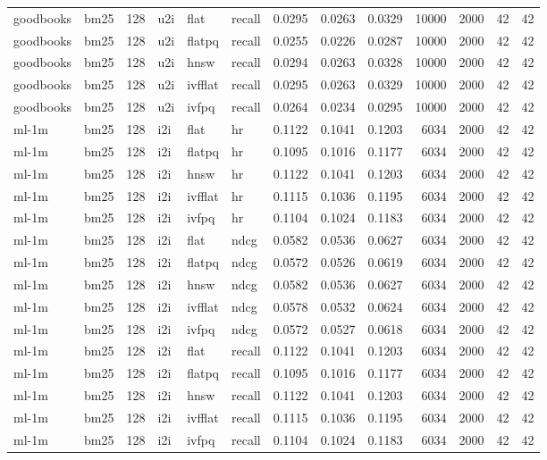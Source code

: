 \begin{tabular}{llrlllrrrrrrr}
goodbooks & bm25 & 128 & u2i & flat & recall & 0.0295 & 0.0263 & 0.0329 & 10000 & 2000 & 42 & 42 \\
goodbooks & bm25 & 128 & u2i & flatpq & recall & 0.0255 & 0.0226 & 0.0287 & 10000 & 2000 & 42 & 42 \\
goodbooks & bm25 & 128 & u2i & hnsw & recall & 0.0294 & 0.0263 & 0.0328 & 10000 & 2000 & 42 & 42 \\
goodbooks & bm25 & 128 & u2i & ivfflat & recall & 0.0295 & 0.0263 & 0.0329 & 10000 & 2000 & 42 & 42 \\
goodbooks & bm25 & 128 & u2i & ivfpq & recall & 0.0264 & 0.0234 & 0.0295 & 10000 & 2000 & 42 & 42 \\
ml-1m & bm25 & 128 & i2i & flat & hr & 0.1122 & 0.1041 & 0.1203 & 6034 & 2000 & 42 & 42 \\
ml-1m & bm25 & 128 & i2i & flatpq & hr & 0.1095 & 0.1016 & 0.1177 & 6034 & 2000 & 42 & 42 \\
ml-1m & bm25 & 128 & i2i & hnsw & hr & 0.1122 & 0.1041 & 0.1203 & 6034 & 2000 & 42 & 42 \\
ml-1m & bm25 & 128 & i2i & ivfflat & hr & 0.1115 & 0.1036 & 0.1195 & 6034 & 2000 & 42 & 42 \\
ml-1m & bm25 & 128 & i2i & ivfpq & hr & 0.1104 & 0.1024 & 0.1183 & 6034 & 2000 & 42 & 42 \\
ml-1m & bm25 & 128 & i2i & flat & ndcg & 0.0582 & 0.0536 & 0.0627 & 6034 & 2000 & 42 & 42 \\
ml-1m & bm25 & 128 & i2i & flatpq & ndcg & 0.0572 & 0.0526 & 0.0619 & 6034 & 2000 & 42 & 42 \\
ml-1m & bm25 & 128 & i2i & hnsw & ndcg & 0.0582 & 0.0536 & 0.0627 & 6034 & 2000 & 42 & 42 \\
ml-1m & bm25 & 128 & i2i & ivfflat & ndcg & 0.0578 & 0.0532 & 0.0624 & 6034 & 2000 & 42 & 42 \\
ml-1m & bm25 & 128 & i2i & ivfpq & ndcg & 0.0572 & 0.0527 & 0.0618 & 6034 & 2000 & 42 & 42 \\
ml-1m & bm25 & 128 & i2i & flat & recall & 0.1122 & 0.1041 & 0.1203 & 6034 & 2000 & 42 & 42 \\
ml-1m & bm25 & 128 & i2i & flatpq & recall & 0.1095 & 0.1016 & 0.1177 & 6034 & 2000 & 42 & 42 \\
ml-1m & bm25 & 128 & i2i & hnsw & recall & 0.1122 & 0.1041 & 0.1203 & 6034 & 2000 & 42 & 42 \\
ml-1m & bm25 & 128 & i2i & ivfflat & recall & 0.1115 & 0.1036 & 0.1195 & 6034 & 2000 & 42 & 42 \\
ml-1m & bm25 & 128 & i2i & ivfpq & recall & 0.1104 & 0.1024 & 0.1183 & 6034 & 2000 & 42 & 42 \\

\end{tabular}
